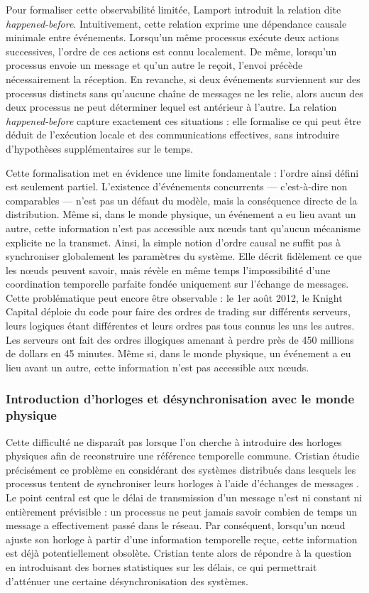\documentclass[12pt,a4paper]{article}
\begin{document}
Pour formaliser cette observabilité limitée, Lamport introduit la relation dite \emph{happened-before}. Intuitivement, cette relation exprime une dépendance causale minimale entre événements. Lorsqu’un même processus exécute deux actions successives, l’ordre de ces actions est connu localement. De même, lorsqu’un processus envoie un message et qu’un autre le reçoit, l’envoi précède nécessairement la réception. En revanche, si deux événements surviennent sur des processus distincts sans qu’aucune chaîne de messages ne les relie, alors aucun des deux processus ne peut déterminer lequel est antérieur à l’autre. La relation \emph{happened-before} capture exactement ces situations : elle formalise ce qui peut être déduit de l’exécution locale et des communications effectives, sans introduire d’hypothèses supplémentaires sur le temps.

Cette formalisation met en évidence une limite fondamentale : l’ordre ainsi défini est seulement partiel. L’existence d’événements concurrents — c’est-à-dire non comparables — n’est pas un défaut du modèle, mais la conséquence directe de la distribution. Même si, dans le monde physique, un événement a eu lieu avant un autre, cette information n’est pas accessible aux nœuds tant qu’aucun mécanisme explicite ne la transmet. Ainsi, la simple notion d’ordre causal ne suffit pas à synchroniser globalement les paramètres du système. Elle décrit fidèlement ce que les nœuds peuvent savoir, mais révèle en même temps l’impossibilité d’une coordination temporelle parfaite fondée uniquement sur l’échange de messages. Cette problématique peut encore être observable : le 1er août 2012, le Knight Capital déploie du code pour faire des ordres de trading sur différents serveurs, leurs logiques étant différentes et leurs ordres pas tous connus les uns les autres. Les serveurs ont fait des ordres illogiques amenant à perdre près de 450 millions de dollars en 45 minutes. Même si, dans le monde physique, un événement a eu lieu avant un autre, cette information n’est pas accessible aux nœuds.

\subsubsection{Introduction d'horloges et désynchronisation avec le monde physique}

Cette difficulté ne disparaît pas lorsque l’on cherche à introduire des horloges physiques afin de reconstruire une référence temporelle commune. Cristian étudie précisément ce problème en considérant des systèmes distribués dans lesquels les processus tentent de synchroniser leurs horloges à l’aide d’échanges de messages \cite{Cristian1989}. Le point central est que le délai de transmission d’un message n’est ni constant ni entièrement prévisible : un processus ne peut jamais savoir combien de temps un message a effectivement passé dans le réseau. Par conséquent, lorsqu’un nœud ajuste son horloge à partir d’une information temporelle reçue, cette information est déjà potentiellement obsolète. Cristian tente alors de répondre à la question en introduisant des bornes statistiques sur les délais, ce qui permettrait d'atténuer une certaine désynchronisation des systèmes.
\end{document}
